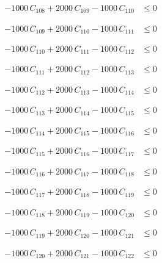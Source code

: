\documentclass[a4paper,11pt]{article}
\begin{document}
\begin{align}
-1000\,C_{108} + 2000\,C_{109} - 1000\,C_{110} &\leq 0 \nonumber
\end{align}

\begin{align}
-1000\,C_{109} + 2000\,C_{110} - 1000\,C_{111} &\leq 0 \nonumber
\end{align}

\begin{align}
-1000\,C_{110} + 2000\,C_{111} - 1000\,C_{112} &\leq 0 \nonumber
\end{align}

\begin{align}
-1000\,C_{111} + 2000\,C_{112} - 1000\,C_{113} &\leq 0 \nonumber
\end{align}

\begin{align}
-1000\,C_{112} + 2000\,C_{113} - 1000\,C_{114} &\leq 0 \nonumber
\end{align}

\begin{align}
-1000\,C_{113} + 2000\,C_{114} - 1000\,C_{115} &\leq 0 \nonumber
\end{align}

\begin{align}
-1000\,C_{114} + 2000\,C_{115} - 1000\,C_{116} &\leq 0 \nonumber
\end{align}

\begin{align}
-1000\,C_{115} + 2000\,C_{116} - 1000\,C_{117} &\leq 0 \nonumber
\end{align}

\begin{align}
-1000\,C_{116} + 2000\,C_{117} - 1000\,C_{118} &\leq 0 \nonumber
\end{align}

\begin{align}
-1000\,C_{117} + 2000\,C_{118} - 1000\,C_{119} &\leq 0 \nonumber
\end{align}

\begin{align}
-1000\,C_{118} + 2000\,C_{119} - 1000\,C_{120} &\leq 0 \nonumber
\end{align}

\begin{align}
-1000\,C_{119} + 2000\,C_{120} - 1000\,C_{121} &\leq 0 \nonumber
\end{align}

\begin{align}
-1000\,C_{120} + 2000\,C_{121} - 1000\,C_{122} &\leq 0 \nonumber
\end{align}
\end{document}

